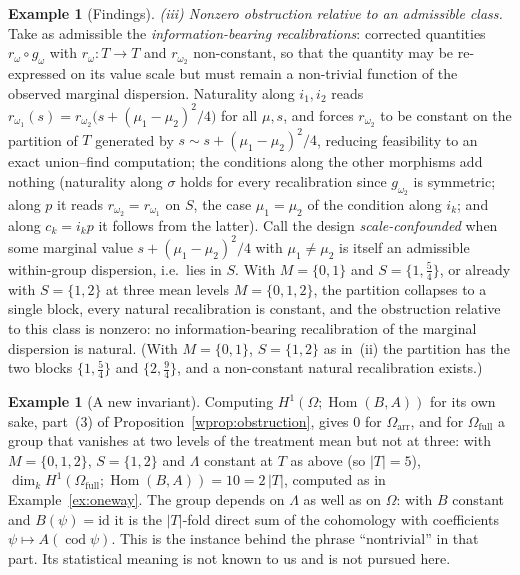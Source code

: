 \documentclass[11pt,a4paper]{article}
\theoremstyle{plain}
\theoremstyle{definition}
\newtheorem{example}[theorem]{Example}
\theoremstyle{remark}
\newcommand{\cat}[1]{\mathsf{#1}}
\newcommand{\catO}{\cat{\Omega}}
\newcommand{\id}{\mathrm{id}}
\DeclareMathOperator{\Hom}{Hom}
\begin{document}
\begin{example}[Findings]
\emph{(iii) Nonzero obstruction relative to an admissible class.} Take as
admissible the \emph{information-bearing recalibrations}: corrected quantities
$r_\omega \circ g_\omega$ with $r_\omega \colon T \to T$ and $r_{\omega_2}$
non-constant, so that the quantity may be re-expressed on its value scale but
must remain a non-trivial function of the observed marginal dispersion.
Naturality along $i_1, i_2$ reads $r_{\omega_1}(s) = r_{\omega_2}\bigl(s +
(\mu_1-\mu_2)^2/4\bigr)$ for all $\mu, s$, and forces $r_{\omega_2}$ to be
constant on the partition of $T$ generated by $s \sim s + (\mu_1-\mu_2)^2/4$,
reducing feasibility to an exact union--find computation; the conditions
along the other morphisms add nothing (naturality along $\sigma$ holds for
every recalibration since $g_{\omega_2}$ is symmetric; along $p$ it reads
$r_{\omega_2} = r_{\omega_1}$ on $S$, the case $\mu_1 = \mu_2$ of the
condition along $i_k$; and along $c_k = i_k p$ it follows from the latter).
Call the design \emph{scale-confounded} when some marginal value
$s + (\mu_1-\mu_2)^2/4$ with $\mu_1 \neq \mu_2$ is itself an admissible
within-group dispersion, i.e.\ lies in $S$. With $M = \{0,1\}$ and
$S = \{1,\tfrac54\}$, or already with $S = \{1,2\}$ at three mean levels
$M = \{0,1,2\}$, the partition collapses to a single block, every natural
recalibration is constant, and the obstruction relative to this class is
nonzero: no information-bearing recalibration of the marginal dispersion is
natural. (With $M = \{0,1\}$, $S = \{1,2\}$ as in~(ii) the partition has the
two blocks $\{1,\tfrac54\}$ and $\{2,\tfrac94\}$, and a non-constant natural
recalibration exists.)
\end{example}

\begin{example}[A new invariant]\label{ex:oneway-h1}
Computing $H^{1}(\catO;\Hom(B,A))$ for its own sake, part~(3) of
Proposition~\ref{wprop:obstruction}, gives $0$ for $\catO_{\mathrm{arr}}$,
and for $\catO_{\mathrm{full}}$ a group that vanishes at two levels of the
treatment mean but not at three: with $M = \{0,1,2\}$, $S = \{1,2\}$ and
$\Lambda$ constant at $T$ as above (so $|T| = 5$),
$\dim_{k} H^{1}(\catO_{\mathrm{full}};\Hom(B,A)) = 10 = 2\,|T|$, computed
as in Example~\ref{ex:oneway}. The group depends on $\Lambda$ as well as on
$\catO$: with $B$ constant and $B(\psi) = \id$ it is the $|T|$-fold direct sum
of the cohomology with coefficients $\psi \mapsto A(\operatorname{cod}\psi)$.
This is the instance behind the phrase ``nontrivial'' in that part. Its
statistical meaning is not known to us and is not pursued here.
\end{example}
\end{document}
